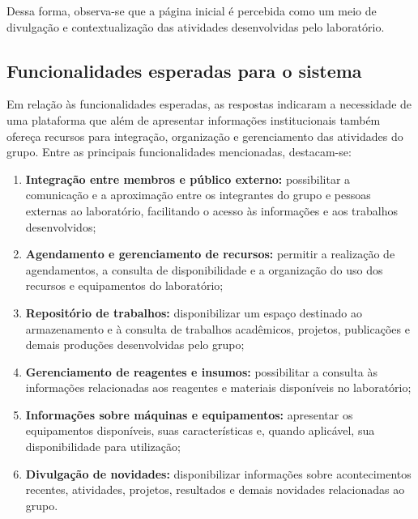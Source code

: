 Dessa forma, observa-se que a página inicial é percebida como um meio de divulgação e contextualização das atividades desenvolvidas pelo laboratório.
\vspace{5mm}
\subsection{Funcionalidades esperadas para o sistema}

Em relação às funcionalidades esperadas, as respostas indicaram a necessidade de uma plataforma que além de apresentar informações institucionais também ofereça recursos para integração, organização e gerenciamento das atividades do grupo. Entre as principais funcionalidades mencionadas, destacam-se:

\begin{enumerate}
	\item \textbf{Integração entre membros e público externo:} possibilitar a comunicação e a aproximação entre os integrantes do grupo e pessoas externas ao laboratório, facilitando o acesso às informações e aos trabalhos desenvolvidos;
	
	\item \textbf{Agendamento e gerenciamento de recursos:} permitir a realização de agendamentos, a consulta de disponibilidade e a organização do uso dos recursos e equipamentos do laboratório;
	
	\item \textbf{Repositório de trabalhos:} disponibilizar um espaço destinado ao armazenamento e à consulta de trabalhos acadêmicos, projetos, publicações e demais produções desenvolvidas pelo grupo;
	
	\item \textbf{Gerenciamento de reagentes e insumos:} possibilitar a consulta às informações relacionadas aos reagentes e materiais disponíveis no laboratório;
	
	\item \textbf{Informações sobre máquinas e equipamentos:} apresentar os equipamentos disponíveis, suas características e, quando aplicável, sua disponibilidade para utilização;
	
	\item \textbf{Divulgação de novidades:} disponibilizar informações sobre acontecimentos recentes, atividades, projetos, resultados e demais novidades relacionadas ao grupo.
\end{enumerate}

